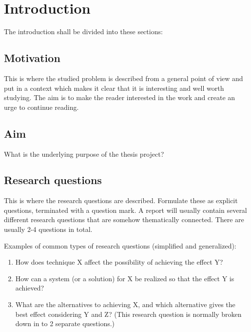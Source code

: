 \documentclass[english]{hitthesis}
\begin{document}
    \chapter{Introduction}
    \label{cha:introduction}

    The introduction shall be divided into these sections:

    \section{Motivation}
    \label{sec:motivation}


    This is where the studied problem is described from a general
    point of view and put in a context which makes it clear that
    it is interesting and well worth studying. The aim is to make
    the reader interested in the work and create an urge to
    continue reading.

    \section{Aim}
    \label{sec:aim}


    What is the underlying purpose of the thesis project?

    \section{Research questions}
    \label{sec:research-questions}


    This is where the research questions are described.
    Formulate these as explicit questions, terminated with a
    question mark. A report will usually contain several different
    research questions that are somehow thematically connected.
    There are usually 2-4 questions in total.

    Examples of common types of research questions (simplified
    and generalized):

    \begin{enumerate}
    \item How does technique X affect the possibility of achieving the
      effect Y?

    \item How can a system (or a solution) for X be realized so
      that the effect Y is achieved?

    \item What are the alternatives to
      achieving X, and which alternative gives the best effect considering
      Y and Z? (This research question is normally broken down in to 2
      separate questions.)

    \end{enumerate}
\end{document}
